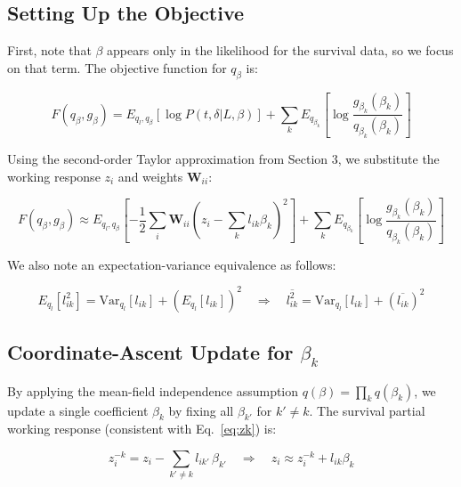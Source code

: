 \documentclass{article}[12pt]
\begin{document}
\subsection{Setting Up the Objective}

First, note that $\beta$ appears only in the likelihood for the survival data, so we focus on that term. The objective function for $q_\beta$ is:

\begin{equation}
    F\left(q_{\beta}, g_{\beta}\right) = E_{q_l, q_{\beta}}\left[\log P\left(t, \delta \vert L, \beta\right)\right] + \sum_{k}E_{q_{\beta_k}}\left[\log \frac{g_{\beta_k}\left(\beta_k\right)}{q_{\beta_k}\left(\beta_k\right)}\right]
\end{equation}

Using the second-order Taylor approximation from Section 3, we substitute the working response $z_i$ and weights $\mathbf{W}_{ii}$:

\begin{equation}
    F(q_{\beta}, g_{\beta}) \approx E_{q_l, q_{\beta}} \left[ -\frac{1}{2}\sum_i \mathbf{W}_{ii}\left(z_i - \sum_k l_{ik}\beta_k\right)^2 \right] + \sum_k E_{q_{\beta_k}} \left[ \log \frac{g_{\beta_k}(\beta_k)}{q_{\beta_k}(\beta_k)} \right]\label{eq:Fqb-approx}
\end{equation}

We also note an expectation-variance equivalence as follows:

\begin{equation}
    E_{q_l}\left[l_{ik}^{2}\right] = \mathrm{Var}_{q_l}\left[l_{ik}\right] + \left(E_{q_l}\left[l_{ik}\right]\right)^2 \quad\Rightarrow\quad \overline{l_{ik}^{2}} = \mathrm{Var}_{q_l}\left[l_{ik}\right] + \left(\overline{l_{ik}}\right)^2
\end{equation}

\subsection{Coordinate-Ascent Update for $\beta_k$}

By applying the mean-field independence assumption $q(\beta) = \prod_k q(\beta_k)$, we update a single coefficient $\beta_k$ by fixing all $\beta_{k'}$ for $k' \neq k$. The survival partial working response (consistent with Eq.~\ref{eq:zk}) is:

\begin{equation}
    z_i^{-k} = z_i - \sum_{k' \neq k} l_{ik'} \,\beta_{k'}
    \quad\Rightarrow\quad z_i \approx z_i^{-k} + l_{ik}\beta_k
\end{equation}
\end{document}
